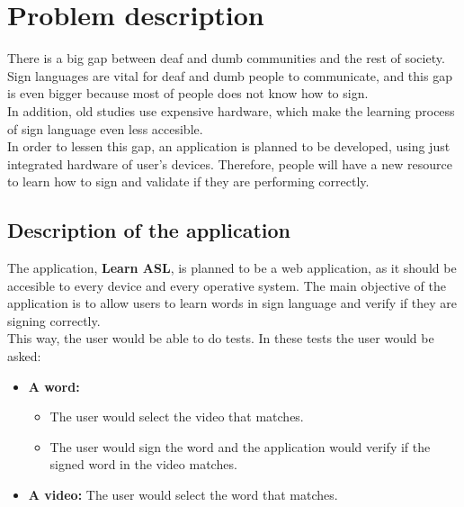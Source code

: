\chapter{Problem description}

There is a big gap between deaf and dumb communities and the rest of society. Sign languages are vital for deaf and dumb people to communicate, and this gap is even bigger because most of people does not know how to sign. \\

In addition, old studies use expensive hardware, which make the learning process of sign language even less accesible. \\ 

In order to lessen this gap, an application is planned to be developed, using just integrated hardware of user's devices. Therefore, people will have a new resource to learn how to sign and validate if they are performing correctly.

\section{Description of the application}
The application, \textbf{Learn ASL}, is planned to be a web application, as it should be accesible to every device and every operative system.
The main objective of the application is to allow users to learn words in sign language and verify if they are signing correctly. \\

This way, the user would be able to do tests. In these tests the user would be asked:
\begin{itemize}[noitemsep]
    \item \textbf{A word:} 
        \begin{itemize}[noitemsep]
            \item The user would select the video that matches.
            \item The user would sign the word and the application would verify if the signed word in the video matches.
        \end{itemize}
    \item \textbf{A video:} The user would select the word that matches.
\end{itemize}

